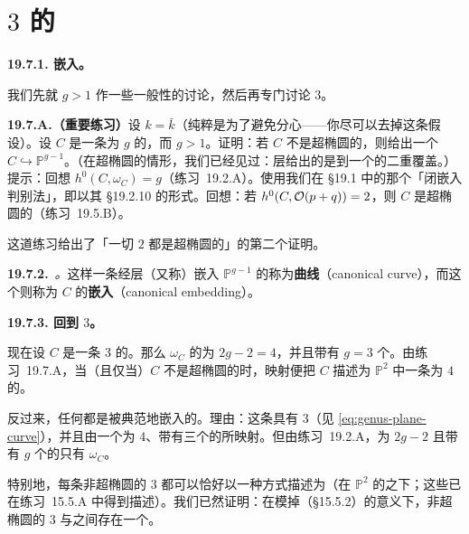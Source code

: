
\section{\trGenus{} $3$ 的\trCurve}

\textbf{19.7.1. \trCanonical{}嵌入。}

我们先就\trGenus{} $g>1$ 作一些一般性的讨论，然后再专门讨论\trGenus{} $3$。

\textbf{19.7.A.（重要练习）}\quad 设 $k=\bar{k}$（纯粹是为了避免分心——你尽可以去掉这条假设）。设 $C$ 是一条\trGenus{}为 $g$ 的\trCurve，而 $g>1$。证明：若 $C$ 不是超椭圆的，则\trCanonical{}\trInvertibleSheaf{}给出一个\trClosedEmbedding{} $C\hookrightarrow\mathbb{P}^{g-1}$。（在超椭圆的情形，我们已经见过：\trCanonical{}层给出的是到一个\trRationalNormalCurve{}的二重覆盖。）提示：回想 $h^0(C,\omega_C)=g$（\mbox{练习~19.2.A}）。使用我们在 \S19.1 中的那个「闭嵌入判别法」，即以其 \S19.2.10 的形式。回想：若 $h^0(C,\mathcal{O}(p+q))=2$，则 $C$ 是超椭圆的（\mbox{练习~19.5.B}）。

这道练习给出了「一切\trGenus{} $2$ \trCurve{}都是超椭圆的」的第二个证明。

\textbf{19.7.2.}\ \emph{\trhDefinition{}。}\quad 这样一条经\trCanonical{}层（又称\trCanonical{}\trLineBundle）嵌入 $\mathbb{P}^{g-1}$ 的\trCurve{}称为\textbf{\trCanonical{}曲线}（canonical curve），而这个\trClosedEmbedding{}则称为 $C$ 的\textbf{\trCanonical{}嵌入}（canonical embedding）。

\textbf{19.7.3. 回到\trGenus{} $3$。}

现在设 $C$ 是一条\trGenus{} $3$ 的\trCurve。那么 $\omega_C$ 的\trDegree{}为 $2g-2=4$，并且带有 $g=3$ 个\trSection。由\mbox{练习~19.7.A}，当（且仅当）$C$ 不是超椭圆的时，\trCanonical{}映射便把 $C$ 描述为 $\mathbb{P}^2$ 中一条\trDegree{}为 $4$ 的\trCurve。

反过来，任何\trPlaneQuartic{}都是被典范地嵌入的。理由：这条\trCurve{}具有\trGenus{} $3$（见 \eqref{eq:genus-plane-curve}），并且由一个\trDegree{}为 $4$、带有三个\trSection{}的\trInvertibleSheaf{}所映射。但由\mbox{练习~19.2.A}，\trDegree{}为 $2g-2$ 且带有 $g$ 个\trSection{}的\trInvertibleSheaf{}只有 $\omega_C$。

特别地，每条非超椭圆的\trGenus{} $3$ \trCurve{}都可以恰好以一种方式描述为\trPlaneQuartic{}（在 $\mathbb{P}^2$ 的\trAutomorphism{}之下；这些\trAutomorphism{}已在\mbox{练习~15.5.A} 中得到描述）。我们已然证明：在模掉\trProjectiveTransformation{}（\S15.5.2）的意义下，非超椭圆的\trGenus{} $3$ \trCurve{}与\trPlaneQuartic{}之间存在一个\trBijection。

